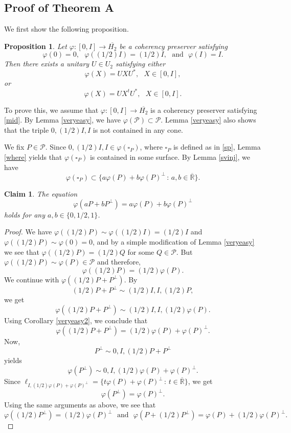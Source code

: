 \documentclass[10pt]{amsart}
\newtheorem{proposition}[theorem]{Proposition}
\newtheorem{claim}[theorem]{Claim}
\theoremstyle{definition}
\theoremstyle{remark}
\numberwithin{subsection}{section}
\numberwithin{equation}{section}
\newcommand\oH{{\overline{H_2}}}
\newcommand\oR{{\overline{\mathbb{R}}}}
\begin{document}
\subsection{Proof of Theorem A}\label{ptand}
We first show the following proposition.
\begin{proposition}\label{unitary}
Let $\varphi\colon [0, I]\to \oH$ be a coherency preserver satisfying 
\begin{equation}\label{mid}
\varphi (0) = 0, \ \ \ \varphi ((1/2)I) = (1/2)I, \ \ \ \text{and} \ \ \ \varphi (I) = I.
\end{equation}
Then there exists a unitary $U\in U_2$ satisfying either 
\[
\varphi(X)=UXU^*,\ \ \ X\in [0, I],
\]
or 
\[
\varphi(X)=UX^tU^*, \ \ \ X\in [0, I].
\]
\end{proposition}
To prove this, we assume that $\varphi\colon [0, I]\to \oH$ is a coherency preserver satisfying \eqref{mid}.
By Lemma \ref{veryeasy}, we have $\varphi (\mathcal{P}) \subset \mathcal{P}$.
Lemma \ref{veryeasy} also shows that the triple $0, (1/2)I, I$ is not contained in any cone.

We fix $P \in \mathcal{P}$. Since $0, (1/2)I, I \in \varphi ({\square}_P)$, where ${\square}_P$ is defined as in \eqref{sp}, Lemma \ref{where} yields that $\varphi ({\square}_P)$ is contained in some surface. By Lemma \ref{svinj}, we have
\[
\varphi ({\square}_P) \subset 
\{ a \varphi (P) + b \varphi (P)^\perp \, : \, a,b \in {\oR} \}.
\]


\begin{claim}\label{0121}
The equation
\begin{equation}\label{iris}
\varphi (aP + bP^\perp ) = a \varphi (P) + b \varphi (P)^\perp
\end{equation}
holds for any $a, b\in \{0, 1/2, 1\}$.
\end{claim}
\begin{proof}
We have $\varphi ( (1/2)P) \sim \varphi ((1/2)I) =(1/2)I$ and $\varphi ((1/2)P) \sim \varphi (0) = 0$, and by a simple modification of Lemma \ref{veryeasy} we see that $\varphi ( (1/2)P) = (1/2)Q$ for some $Q \in \mathcal{P}$. But $\varphi ( (1/2)P) \sim \varphi (P)\in \mathcal{P}$ and therefore,
\[
\varphi ((1/2)P) = (1/2)\varphi (P).
\]
We continue with $\varphi ((1/2)P + P^\perp)$. By
\[
(1/2)P + P^\perp \sim (1/2)I, I, (1/2)P,
\] 
we get
\[
\varphi ((1/2)P + P^\perp) \sim (1/2)I, I, (1/2) \varphi (P).
\]
Using Corollary \ref{veryeasy2}, we conclude that
\[
\varphi ((1/2)P + P^\perp) = (1/2) \varphi (P)+ \varphi(P)^\perp.
\]
Now,
\[
P^\perp \sim 0, I, (1/2)P + P^\perp
\]
yields
\[
\varphi(P^\perp) \sim 0, I, (1/2) \varphi (P)+ \varphi(P)^\perp.
\]
Since $\ell_{I, (1/2) \varphi (P)+ \varphi(P)^\perp} = \{t\varphi(P)+\varphi(P)^\perp\,:\,  t\in \oR\}$, we get
\[
\varphi (P^\perp) = \varphi (P)^\perp.
\]
Using the same arguments as above, we see that
\[
\varphi ((1/2)P^\perp) = (1/2)\varphi (P)^\perp \ \ \ \text{and} \ \ \  \varphi (P + (1/2)P^\perp) = \varphi (P) + (1/2)\varphi (P)^\perp .
\]
\end{proof}
\end{document}
